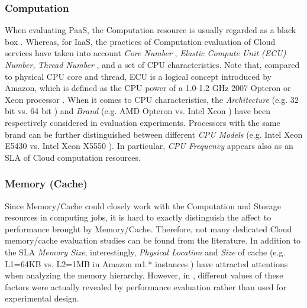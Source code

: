 \documentclass[10pt, conference, compsocconf]{IEEEtran}
\begin{document}
\subsubsection{Computation}
When evaluating PaaS, the Computation resource is usually regarded as a black box \cite{Iosup_Yigitbasi_2010}. Whereas, for IaaS, the practices of Computation evaluation of Cloud services have taken into account \textit{Core Number} \cite{Bientinesi_Iakymchuk_2010}, \textit{Elastic Compute Unit (ECU) Number}, \textit{Thread Number} \cite{Baun_Kunze_2009}, and a set of CPU characteristics. Note that, compared to physical CPU core and thread, ECU is a logical concept introduced by Amazon, which is defined as the CPU power of a 1.0-1.2 GHz 2007 Opteron or Xeon processor \cite{Ostermann_Iosup_2009}. When it comes to CPU characteristics, the \textit{Architecture} (e.g. 32 bit vs. 64 bit \cite{Iosup_Yigitbasi_2010}) and \textit{Brand} (e.g. AMD Opteron vs. Intel Xeon \cite{Napper_Bientinesi_2009}) have been respectively considered in evaluation experiments. Processors with the same brand can be further distinguished between different \textit{CPU Models} (e.g. Intel Xeon E5430 vs. Intel Xeon X5550 \cite{Bientinesi_Iakymchuk_2010}). In particular, \textit{CPU Frequency} appears also as an SLA of Cloud computation resources.

\subsubsection{Memory (Cache)}
Since Memory/Cache could closely work with the Computation and Storage resources in computing jobs, it is hard to exactly distinguish the affect to performance brought by Memory/Cache. Therefore, not many dedicated Cloud memory/cache evaluation studies can be found from the literature. In addition to the SLA \textit{Memory Size}, interestingly, \textit{Physical Location} and \textit{Size} of cache (e.g. L1=64KB vs. L2=1MB in Amazon m1.* instances \cite{Ostermann_Iosup_2009}) have attracted attentions when analyzing the memory hierarchy. However, in \cite{Ostermann_Iosup_2009}, different values of these factors were actually revealed by performance evaluation rather than used for experimental design. 
 
\end{document}
